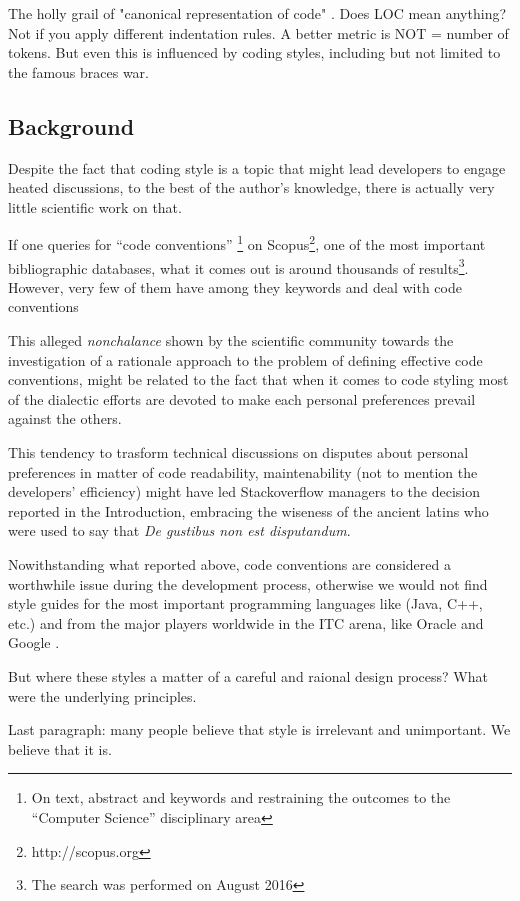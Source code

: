 The holly grail of "canonical representation of code" .
Does LOC mean anything?
Not if you apply different indentation rules.
A better metric is NOT = number of tokens.
But even this is influenced by coding styles, including but
not limited to the famous braces war.

\subsection{Background}

Despite the fact that coding style is a topic that might lead developers to engage heated 
discussions, to the best of the author's knowledge, there is actually very little scientific 
work on that. 

If one queries for ``code conventions''
\footnote{On text, abstract and keywords and restraining the outcomes to the ``Computer Science''
disciplinary area} 
on Scopus\footnote{http://scopus.org}, one of the most important bibliographic databases, what it comes out is around 
thousands of results\footnote{The search was performed on August 2016}. 
However, very few of them  have  among they
keywords and deal with code conventions

This alleged \emph{nonchalance} shown by the scientific community towards the investigation 
of a rationale approach to the problem of defining effective code conventions, might be 
related to the fact that when it comes to code styling most of the dialectic efforts are devoted
to make each personal preferences prevail against the others.

This tendency to trasform technical discussions on disputes about personal preferences 
in matter of code readability, maintenability (not to mention the developers' efficiency) might 
have led Stackoverflow managers to the decision reported in the Introduction, embracing the 
wiseness of the ancient latins who were used to say that \emph{De gustibus non est disputandum}.

Nowithstanding what reported above, code conventions are considered a worthwhile issue during 
the development process, otherwise we would not find style guides for the most important 
programming languages like (Java, C++, etc.) and from the major players worldwide in 
the ITC arena, like Oracle and Google \cite{}. 

But where these styles a matter of a careful and raional design process?
What were the underlying principles.

Last paragraph: many people believe that style is irrelevant and unimportant.
We believe that it is.

